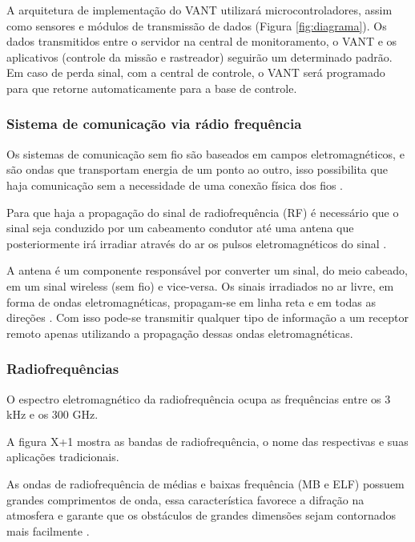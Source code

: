 
A arquitetura de implementação do VANT utilizará microcontroladores, assim como sensores e módulos de transmissão de dados (Figura \ref{fig:diagrama}).
Os dados transmitidos entre o servidor na central de monitoramento, o VANT e os aplicativos (controle da missão e rastreador) seguirão um determinado padrão. Em caso de perda sinal, com a central de controle, o VANT será programado para que retorne automaticamente para a base de controle.


\subsubsection{Sistema de comunicação via rádio frequência}

Os sistemas de comunicação sem fio são baseados em campos eletromagnéticos, e são ondas que transportam energia de um ponto ao outro, isso possibilita que haja comunicação sem a necessidade de uma conexão física dos fios \cite{VALLE1}. 

Para que haja a propagação do sinal de radiofrequência (RF) é necessário que o sinal seja conduzido por um cabeamento condutor até uma antena que posteriormente irá irradiar através do ar os pulsos eletromagnéticos do sinal \cite{VALLE1}. 

A antena é um componente responsável por converter um sinal, do meio cabeado, em um sinal wireless (sem fio) e vice-versa. Os sinais irradiados no ar livre, em forma de ondas eletromagnéticas, propagam-se em linha reta e em todas as direções \cite{Rappaport2}. Com isso pode-se transmitir qualquer tipo de informação a um receptor remoto apenas utilizando a propagação dessas ondas eletromagnéticas.


\subsubsection{Radiofrequências}

O espectro eletromagnético da radiofrequência ocupa as frequências entre os 3 kHz e os 300 GHz. 

A figura X+1 mostra as bandas de radiofrequência, o nome das respectivas e suas aplicações tradicionais.

As ondas de radiofrequência de médias e baixas frequência (MB e ELF) possuem grandes comprimentos de onda, essa característica favorece a difração na atmosfera e garante que os obstáculos de grandes dimensões sejam contornados mais facilmente \cite{Rappaport2}.

